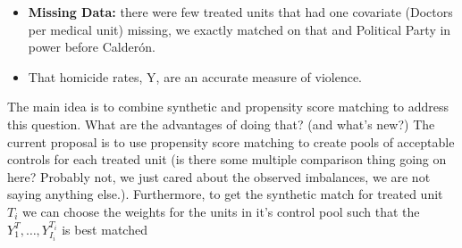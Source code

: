 \documentclass{article}[11 pt]
\begin{document}
\begin{itemize}
			\item \textbf{Missing Data:} there were few treated units that had one covariate (Doctors per medical unit) missing, we exactly matched on that and Political Party in power before Calder\'{o}n.
				\item That homicide rates, Y, are an accurate measure of violence. 				
		\end{itemize}



The main idea is to combine synthetic and propensity score matching to address this question. What are the advantages of doing that? (and what's new?)
The current proposal is to use propensity score matching to create pools of acceptable controls for each treated unit (is there some multiple comparison thing going on here? Probably not, we just cared about the observed imbalances, we are not saying anything else.). Furthermore, to get the synthetic match for treated unit $T_i$ we can choose the weights for the units in it's control pool such that the $Y_1^T,\ldots, Y_{I_i}^{T_i}$ is best matched
\end{document}
